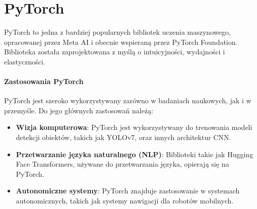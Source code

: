 \documentclass[a4paper,twoside,12pt]{book}
\begin{document}
\newpage
\section{PyTorch}
PyTorch to jedna z bardziej popularnych bibliotek uczenia maszynowego, opracowanej przez Meta AI i obecnie wspieraną przez PyTorch Foundation. Biblioteka została zaprojektowana z myślą o intuicyjności, wydajności i elastyczności.


\paragraph{Zastosowania PyTorch}
PyTorch jest szeroko wykorzystywany zarówno w badaniach naukowych, jak i w przemyśle. Do jego głównych zastosowań należą:
\begin{itemize}
    \item \textbf{Wizja komputerowa}: PyTorch jest wykorzystywany do trenowania modeli detekcji obiektów, takich jak YOLOv7, oraz innych architektur CNN.
    \item \textbf{Przetwarzanie języka naturalnego (NLP)}: Biblioteki takie jak Hugging Face Transformers, używane do przetwarzania języka, opierają się na PyTorch.
    \item \textbf{Autonomiczne systemy}: PyTorch znajduje zastosowanie w systemach autonomicznych, takich jak systemy nawigacji dla robotów mobilnych.
\end{itemize}
\end{document}

